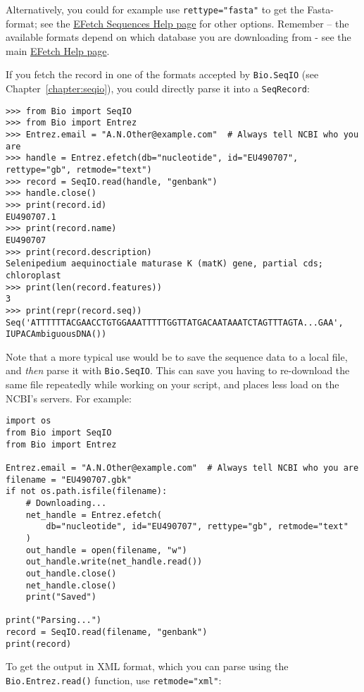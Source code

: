 Alternatively, you could for example use \verb+rettype="fasta"+ to get the Fasta-format; see the \href{https://www.ncbi.nlm.nih.gov/books/NBK25499/#chapter4.EFetch}{EFetch Sequences Help page} for other options. Remember -- the available formats depend on which database you are downloading from - see the main \href{https://www.ncbi.nlm.nih.gov/books/NBK25499/#chapter4.EFetch}{EFetch Help page}.

If you fetch the record in one of the formats accepted by \verb+Bio.SeqIO+ (see Chapter~\ref{chapter:seqio}), you could directly parse it into a \verb+SeqRecord+:

\begin{verbatim}
>>> from Bio import SeqIO
>>> from Bio import Entrez
>>> Entrez.email = "A.N.Other@example.com"  # Always tell NCBI who you are
>>> handle = Entrez.efetch(db="nucleotide", id="EU490707", rettype="gb", retmode="text")
>>> record = SeqIO.read(handle, "genbank")
>>> handle.close()
>>> print(record.id)
EU490707.1
>>> print(record.name)
EU490707
>>> print(record.description)
Selenipedium aequinoctiale maturase K (matK) gene, partial cds; chloroplast
>>> print(len(record.features))
3
>>> print(repr(record.seq))
Seq('ATTTTTTACGAACCTGTGGAAATTTTTGGTTATGACAATAAATCTAGTTTAGTA...GAA', IUPACAmbiguousDNA())
\end{verbatim}

Note that a more typical use would be to save the sequence data to a local file, and \emph{then} parse it with \verb|Bio.SeqIO|.  This can save you having to re-download the same file repeatedly while working on your script, and places less load on the NCBI's servers.  For example:

\begin{verbatim}
import os
from Bio import SeqIO
from Bio import Entrez

Entrez.email = "A.N.Other@example.com"  # Always tell NCBI who you are
filename = "EU490707.gbk"
if not os.path.isfile(filename):
    # Downloading...
    net_handle = Entrez.efetch(
        db="nucleotide", id="EU490707", rettype="gb", retmode="text"
    )
    out_handle = open(filename, "w")
    out_handle.write(net_handle.read())
    out_handle.close()
    net_handle.close()
    print("Saved")

print("Parsing...")
record = SeqIO.read(filename, "genbank")
print(record)
\end{verbatim}

To get the output in XML format, which you can parse using the \verb+Bio.Entrez.read()+ function, use \verb+retmode="xml"+:

